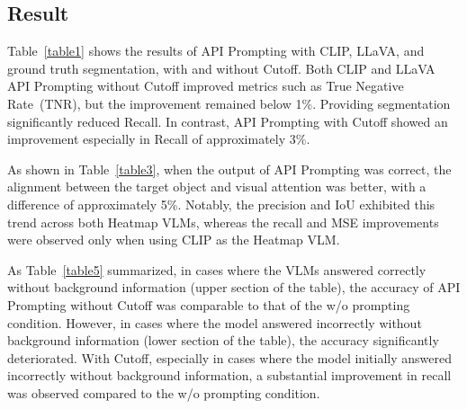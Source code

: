 \subsection{Result}
Table~\ref{table1} shows the results of API Prompting with CLIP, LLaVA, and ground truth segmentation, with and without Cutoff. Both CLIP and LLaVA API Prompting without Cutoff improved metrics such as True Negative Rate~(TNR), but the improvement remained below 1\%. Providing segmentation significantly reduced Recall. In contrast, API Prompting with Cutoff showed an improvement especially in Recall of approximately 3\%.

As shown in Table~\ref{table3}, when the output of API Prompting was correct, the alignment between the target object and visual attention was better, with a difference of approximately 5\%. Notably, the precision and IoU exhibited this trend across both Heatmap VLMs, whereas the recall and MSE improvements were observed only when using CLIP as the Heatmap VLM.

As Table~\ref{table5} summarized, in cases where the VLMs answered correctly without background information (upper section of the table), the accuracy of API Prompting without Cutoff was comparable to that of the w/o prompting condition. However, in cases where the model answered incorrectly without background information (lower section of the table), the accuracy significantly deteriorated. With Cutoff, especially in cases where the model initially answered incorrectly without background information, a substantial improvement in recall was observed compared to the w/o prompting condition.

